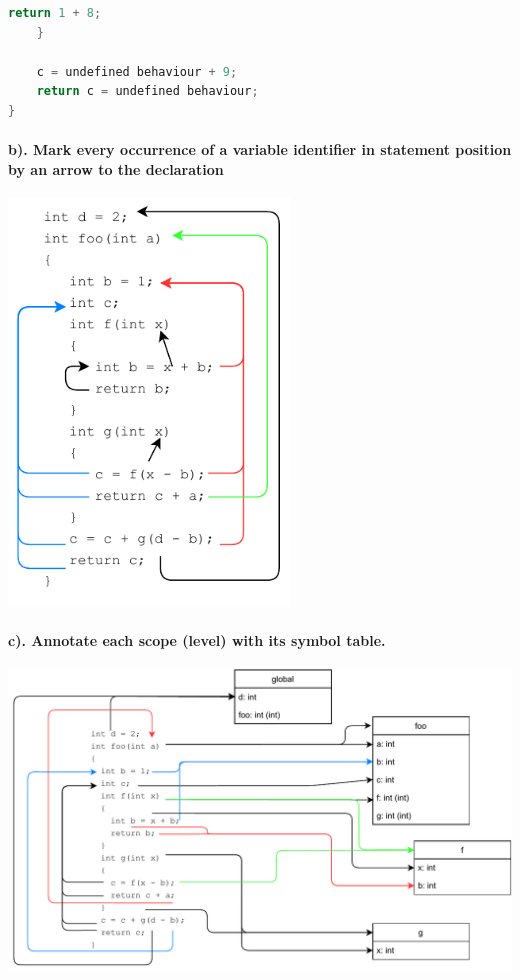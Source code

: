 \documentclass[hidelinks]{uva-inf-article}
\begin{document}
\begin{flushleft}
\begin{lstlisting}[basicstyle=\small, language=C, label=lst:foo8, caption=Execution steps of running foo(8), captionpos=b]
        return 1 + 8;
    }
    
    c = undefined behaviour + 9;
    return c = undefined behaviour;
}
\end{lstlisting}

\newpage
\paragraph{b). Mark every occurrence of a variable identifier in statement position by an arrow to the declaration\\}
\includegraphics[width=7.5cm]{images/1b.pdf}
\paragraph{c). Annotate each scope (level) with its symbol table.\\}
\includegraphics[width=14cm]{images/1c.pdf}
\newpage

\end{flushleft}
\end{document}
